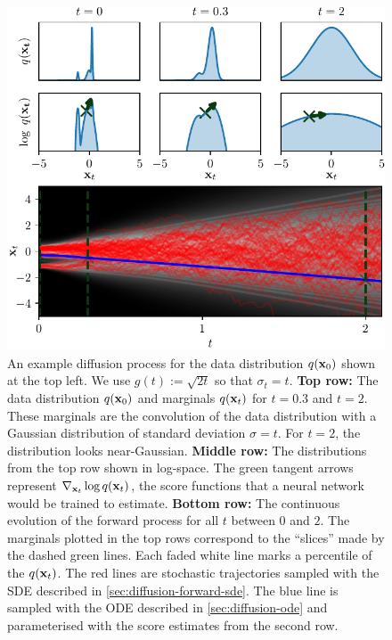 \begin{figure}
    \centering
    \includegraphics[scale=1]{figs/thesis/diffusion_process.pdf}
    \caption{An example diffusion process for the data distribution $q({\mathbf{x}}_0)$ shown at the top left. We use $g(t) := \sqrt{2t}$ so that $\sigma_t = t$. \textbf{Top row:} The data distribution $q({\mathbf{x}}_0)$ and marginals $q({\mathbf{x}}_t)$ for $t=0.3$ and $t=2$. These marginals are the convolution of the data distribution with a Gaussian distribution of standard deviation $\sigma = t$. For $t=2$, the distribution looks near-Gaussian. \textbf{Middle row:} The distributions from the top row shown in log-space. The green tangent arrows represent $\nabla_{{\mathbf{x}}_t} \log q({\mathbf{x}}_t)$, the score functions that a neural network would be trained to estimate. \textbf{Bottom row:} The continuous evolution of the forward process for all $t$ between $0$ and $2$. The marginals plotted in the top rows correspond to the ``slices'' made by the dashed green lines. Each faded white line marks a percentile of the $q({\mathbf{x}}_t)$. The red lines are stochastic trajectories sampled with the SDE described in \cref{sec:diffusion-forward-sde}. The blue line is sampled with the ODE described in \cref{sec:diffusion-ode} and parameterised with the score estimates from the second row.}
    \label{fig:diffusion-overview}
\end{figure}


